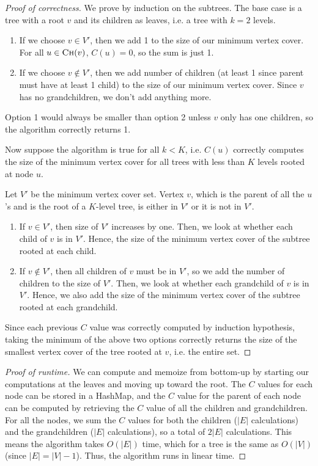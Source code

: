 \documentclass{article}
\begin{document}
\begin{proof}[Proof of correctness]
We prove by induction on the subtrees. The base case is a tree with a root $v$ and its children as leaves, i.e. a tree with $k=2$ levels.
\begin{enumerate}
\item If we choose $v\in V'$, then we add 1 to the size of our minimum vertex cover. For all $u\in \textsc{Ch}(v)$, $C(u)=0$, so the sum is just 1.
\item If we choose $v\notin V'$, then we add number of children (at least 1 since parent must have at least 1 child) to the size of our minimum vertex cover. Since $v$ has no grandchildren, we don't add anything more.
\end{enumerate}
Option 1 would always be smaller than option 2 unless $v$ only has one children, so the algorithm correctly returns 1.

Now suppose the algorithm is true for all $k<K$, i.e. $C(u)$ correctly computes the size of the minimum vertex cover for all trees with less than $K$ levels rooted at node $u$. 

Let $V'$ be the minimum vertex cover set. Vertex $v$, which is the parent of all the $u$'s and is the root of a $K$-level tree, is either in $V'$ or it is not in $V'$.
	\begin{enumerate}
	\item If $v\in V'$, then size of $V'$ increases by one. Then, we look at whether each child of $v$ is in $V'$. Hence, the size of the minimum vertex cover of the subtree rooted at each child.
	\item If $v\notin V'$, then all children of $v$ must be in $V'$, so we add the number of children to the size of $V'$. Then, we look at whether each grandchild of $v$ is in $V'$. Hence, we also add the size of the minimum vertex cover of the subtree rooted at each grandchild.
	\end{enumerate}
Since each previous $C$ value was correctly computed by induction hypothesis, taking the minimum of the above two options correctly returns the size of the smallest vertex cover of the tree rooted at $v$, i.e. the entire set.
\end{proof}

\begin{proof}[Proof of runtime]
We can compute and memoize from bottom-up by starting our computations at the leaves and moving up toward the root. The $C$ values for each node can be stored in a HashMap, and the $C$ value for the parent of each node can be computed by retrieving the $C$ value of all the children and grandchildren. For all the nodes, we sum the $C$ values for both the children ($|E|$ calculations) and the grandchildren ($|E|$ calculations), so a total of $2|E|$ calculations. This means the algorithm takes $O(|E|)$ time, which for a tree is the same as $O(|V|)$ (since $|E|=|V|-1$). Thus, the algorithm runs in linear time.
\end{proof}
\end{document}
